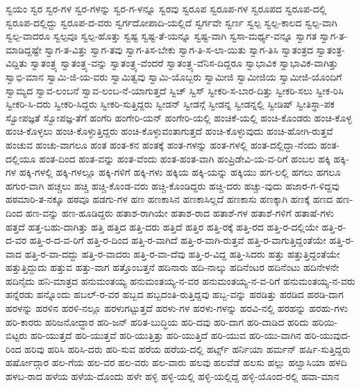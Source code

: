 {ಸ್ವಯಂ
ಸ್ವರ
ಸ್ವರ-ಗಳ
ಸ್ವರ-ಗಳನ್ನು
ಸ್ವರ-ಗ-ಳನ್ನೂ
ಸ್ವರವು
ಸ್ವರೂಪ
ಸ್ವರೂಪ-ಗಳ
ಸ್ವರೂಪದ
ಸ್ವರೂಪ-ದಲ್ಲಿ
ಸ್ವರೂಪ-ದಲ್ಲಿದ್ದು
ಸ್ವರೂಪ-ದ-ವರು
ಸ್ವರ್ಗದೋಪಾದಿ-ಯಲ್ಲಿದೆ
ಸ್ವರ್ಗವೇ
ಸ್ವರ್ಣ
ಸ್ವಲ್ಪ
ಸ್ವಲ್ಪ-ಕಾಲದ
ಸ್ವಲ್ಪ-ವಾಗಿ
ಸ್ವಲ್ಪ-ವಾದರೂ
ಸ್ವಲ್ಪವೂ
ಸ್ವಲ್ಪ-ಹೊತ್ತು
ಸ್ವಷ್ಟ
ಸ್ವಷ್ಟ-ತೆ-ಯನ್ನೂ
ಸ್ವಷ್ಟ-ವಾಗಿ
ಸ್ವಸಾ-ಮರ್ಥ್ಯ-ವನ್ನೂ
ಸ್ವಾಗತ
ಸ್ವಾಗ-ತ-ಮಾಡಿದ್ದಷ್ಟೇ
ಸ್ವಾಗ-ತ-ವಿತ್ತು
ಸ್ವಾಗ-ತವು
ಸ್ವಾಗ-ತಿಸ-ಬೇಕು
ಸ್ವಾಗ-ತಿ-ಸ-ಲಾ-ಯಿತು
ಸ್ವಾಗ-ತಿಸಿ
ಸ್ವಾತಂತ್ರದ
ಸ್ವಾತಂತ್ರ-ವಿದ್ದಿತು
ಸ್ವಾತಂತ್ರ್ಯ
ಸ್ವಾತಂತ್ರ್ಯ-ವನ್ನು
ಸ್ವಾತಂತ್ರ್ಯ-ವೆಂದರೆ
ಸ್ವಾತಂತ್ರ್ಯ-ವೆನಿಸ-ದಿದ್ದರೂ
ಸ್ವಾಭಾವಿಕ
ಸ್ವಾಭಾವಿಕ-ವಾಗಿತ್ತು
ಸ್ವಾಭಿ-ಮಾನ
ಸ್ವಾಮಿ-ಜಿ-ಯ-ವರು
ಸ್ವಾಮಿತ್ವವು
ಸ್ವಾಮಿ-ಯೊಬ್ಬರು
ಸ್ವಾಮೀಜಿ
ಸ್ವಾಮೀಜಿಯ
ಸ್ವಾಮೀಜಿ-ಯೊಂದಿಗೆ
ಸ್ವಾಮ್ಯದ
ಸ್ವಾವ-ಲಂಬನೆ
ಸ್ವಾವ-ಲಂಬ-ನೆ-ಯಾಗುತ್ತದೆ
ಸ್ವಿಚ್
ಸ್ವಿಸ್
ಸ್ವೀಕರಿ-ಸ-ಬಾರ-ದಿತ್ತು
ಸ್ವೀಕರಿ-ಸಲು
ಸ್ವೀಕ-ರಿಸಿ
ಸ್ವೀಕರಿ-ಸಿ-ದರು
ಸ್ವೀಕರಿ-ಸಿದ್ದರು
ಸ್ವೀಕರಿ-ಸುತ್ತಿದ್ದರು
ಸ್ವೀಡನ್
ಸ್ವೀಡನ್ಗೆ
ಸ್ವೀಡನ್ನ
ಸ್ವೀಡನ್ನಲ್ಲಿ
ಸ್ವೀಡಿಷ್
ಸ್ವೀತಿಸ್ಥಾ-ಪಕ
ಸ್ವೋಪಜ್ಞತೆ
ಸ್ವೋಪಜ್ಞ-ತೆಗೆ
ಹಂಗೆರಿ
ಹಂಗೇರಿ-ಯನ್
ಹಂಗೇರಿ-ಯಲ್ಲಿ
ಹಂಚಿಕೆ-ಯಲ್ಲಿ
ಹಂಚಿ-ಕೊಂಡರು
ಹಂಚಿ-ಕೊಳ್ಳ
ಹಂಚಿ-ಕೊಳ್ಳಲು
ಹಂಚಿ-ಕೊಳ್ಳುತ್ತಿದ್ದರು
ಹಂಚಿ-ಕೊಳ್ಳುವಂತಾಗುತ್ತದೆ
ಹಂಚಿ-ಕೊಳ್ಳುವುದು
ಹಂಚಿ-ಹೋಗಿ-ರುತ್ತವೆ
ಹಂಚುವ
ಹಂಚು-ವಾಗಲೂ
ಹಂತ
ಹಂತ-ಕನ
ಹಂತಕ್ಕೆ
ಹಂತ-ಗಳನ್ನು
ಹಂತ-ಗಳಲ್ಲಿ
ಹಂತ-ದಲ್ಲಿದ್ದಾ-ನೆಂದು
ಹಂತ-ದಲ್ಲಿಯೂ
ಹಂತ-ದಿಂದ
ಹಂತ-ವನ್ನು
ಹಂತ-ವೆಂದು
ಹಂತ-ಹಂತ-ವಾಗಿ
ಹಂಪ್ರಿಡೇವಿ-ಯ-ವ-ರಿಗೆ
ಹಂಬಲ
ಹಕ್ಕಿ
ಹಕ್ಕಿ-ಗಳ
ಹಕ್ಕಿ-ಗಳಲ್ಲಿ
ಹಕ್ಕಿ-ಗಳಲ್ಲೂ
ಹಕ್ಕಿ-ಗಳಿಗೆ
ಹಕ್ಕಿ-ಗಳು
ಹಕ್ಕಿಯ
ಹಕ್ಕಿ-ಯನ್ನು
ಹಕ್ಕಿಯು
ಹಗ-ಲಲ್ಲಿ
ಹಗಲು
ಹಗಲೂ
ಹಗುರ-ವಾಗಿ
ಹಚ್ಚಲು
ಹಚ್ಚಿ
ಹಚ್ಚಿ-ಕೊಂಡ-ವರು
ಹಚ್ಚಿ-ಕೊಂಡಿದ್ದರು
ಹಚ್ಚಿ-ದರು
ಹಚ್ಚು-ವುದು
ಹಜಾರ-ಗ-ಳಿದ್ದವು
ಹಠಮಾರಿ-ತ-ನಕ್ಕೂ
ಹಠವೂ
ಹಡಗು-ಗಳ
ಹಣ
ಹಣಕಾಸಿನ
ಹಣಕಾಸಿಲ್ಲದೆ
ಹಣಕಾಸು
ಹಣಕ್ಕಾಗಿ
ಹಣಕ್ಕೆ
ಹಣದ
ಹಣ-ದಿಂದ
ಹಣ-ವನ್ನು
ಹಣ-ಹೂಡಿದ್ದರು
ಹತಾಶ-ರಾಗಿಯೇ
ಹತಾಶ-ರಾದ
ಹತಾಶೆ-ಗಳ
ಹತಾಶೆ-ಗಳಿಗೆ
ಹತಾಷೆ-ಗಳು
ಹತ್ತದೆ
ಹತ್ತ-ಬಹು-ದಾಗಿತ್ತು
ಹತ್ತಿ
ಹತ್ತಿದ
ಹತ್ತಿ-ದರು
ಹತ್ತಿದೆ
ಹತ್ತಿರ
ಹತ್ತಿ-ರಕ್ಕೆ
ಹತ್ತಿ-ರದ
ಹತ್ತಿ-ರ-ದಲ್ಲಿಯೇ
ಹತ್ತಿ-ರ-ದ-ವರ
ಹತ್ತಿ-ರ-ದ-ವ-ರಿಗೆ
ಹತ್ತಿ-ರ-ದಿಂದ
ಹತ್ತಿ-ರ-ವಾಗಿದೆ
ಹತ್ತಿ-ರ-ವಾಗಿ-ರುತ್ತವೆ
ಹತ್ತಿ-ರ-ವಾಗುತ್ತಿದ್ದಂತೆಯೇ
ಹತ್ತಿ-ರ-ವಾದ
ಹತ್ತಿ-ರ-ವಾ-ದದ್ದು
ಹತ್ತಿ-ರ-ವಾದರು
ಹತ್ತಿ-ರ-ವಾ-ದೆವು
ಹತ್ತಿ-ರ-ವಿದ್ದ
ಹತ್ತಿ-ಸಿದರು
ಹತ್ತು
ಹತ್ತುತ್ತಿದ್ದಂತೆಯೇ
ಹತ್ತುತ್ತಿದ್ದುದು
ಹತ್ತುವ
ಹತ್ತು-ವಾಗ
ಹತ್ತೊಂಬತ್ತನೆ
ಹದಿನಾರು
ಹದಿ-ನಾಲ್ಕು
ಹದಿನೆಂಟರ
ಹದಿನೆಂಟು
ಹದಿನೇಳನೇ
ಹದಿನೈದು
ಹನಿ-ಮಾತ್ರದ
ಹನುಮಂತಯ್ಯ
ಹನುಮಂತಯ್ಯ-ನ-ವರ
ಹನುಮಂತಯ್ಯ-ನ-ವ-ರಿಗೆ
ಹನುಮಂತಯ್ಯ-ನ-ವರು
ಹನ್ನೆರಡು
ಹನ್ನೊಂದು
ಹಬಲ್-ರ-ವರ
ಹಬ್ಬದ
ಹಬ್ಬದಂತಿ-ರುತ್ತಿದ್ದವು
ಹಬ್ಬ-ವನ್ನು
ಹರಡಿತ್ತು
ಹರಡಿದ
ಹರಡಿ-ದಾಗ
ಹರಳನ್ನು
ಹರಳಿನ
ಹರಳಿ-ನಲ್ಲೂ
ಹರಳುಗಟ್ಟುತ್ತದೆ
ಹರಳು-ಗಳ
ಹರಳು-ಗಳನ್ನು
ಹರವಿ-ನಲ್ಲಿ
ಹರಹನ್ನು
ಹರಹು-ಗಳು
ಹರಿ-ಕಾರರು
ಹರಿಜನೋದ್ಧಾರ
ಹರಿ-ಜನ್
ಹರಿತ-ಬುದ್ಧಿಯ
ಹರಿ-ದವು
ಹರಿ-ದಾಗ
ಹರಿ-ದಾಡಿದ
ಹರಿದು
ಹರಿಯಿ-ಬಿಟ್ಟರು
ಹರಿ-ಯುತ್ತದೆ
ಹರಿ-ಯುತ್ತವೆ
ಹರಿ-ಯುತ್ತಿತ್ತು
ಹರಿ-ಯುತ್ತಿದೆ
ಹರಿ-ಯುವ
ಹರಿ-ಯು-ವಾಗಿನ
ಹರಿ-ಯುವುದ-ರಿಂದ
ಹರಿವು
ಹರಿಸಿ
ಹರಿಸಿ-ದರು
ಹರಿ-ಸುವ
ಹರೆಯ
ಹರೆಯ-ದಲ್ಲಿ
ಹರ್ಟ್ಸ್
ಹರ್ನಿಯಾ
ಹರ್ಮನ್
ಹರ್ಷಿ-ಸುತ್ತಿದ್ದರು
ಹರ್ಷೋದ್ಗಾರ
ಹಲ-ಗೆಯ
ಹಲ-ವರ
ಹಲ-ವರು
ಹಲ-ವಾರು
ಹಲವು
ಹಲವೆಡೆ
ಹಲಸು
ಹಲ್ಲು
ಹಲ್ವಾಸಿಯಾ
ಹಳದಿ
ಹಳಬ-ರಾದ
ಹಳೆಯ
ಹಳೆಯ-ದೊಂದು
ಹಳೇ
ಹಳ್ಳಿ
ಹಳ್ಳಿ-ಯಲ್ಲಿ
ಹಳ್ಳಿ-ಯಲ್ಲಿದ್ದ
ಹಳ್ಳಿ-ಯೊಂದ-ರಲ್ಲಿ
ಹವಾ-ಮಾನ
}
